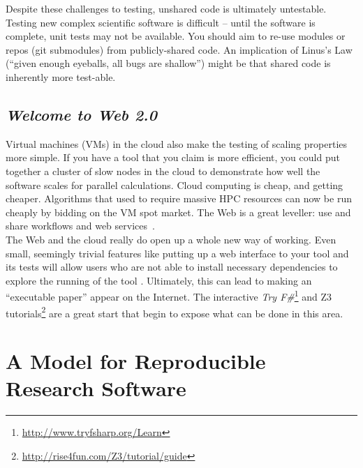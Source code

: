 \documentclass[a4paper,11pt]{article}
\begin{document}
 Despite these
challenges to testing, unshared code is ultimately untestable.
Testing new complex scientific software is difficult -- until the
software is complete, unit tests may not be available. You should aim
to re-use modules or repos (git submodules) from publicly-shared
code. An implication of Linus's Law (``given enough eyeballs, all bugs
are shallow'') might be that shared code is inherently more test-able.


\subsection{{\emph{Welcome to Web 2.0}}}

Virtual machines (VMs) in the cloud also make the testing of scaling
properties more simple.  If you have a tool that you claim is more
efficient, you could put together a cluster of slow nodes in the cloud
to demonstrate how well the software scales for parallel calculations.
Cloud computing is cheap, and getting cheaper. Algorithms that used to
require massive HPC resources can now be run cheaply by bidding on the
VM spot market. The Web is a great leveller: use and share workflows
and web services~\cite{crick-et-al:2009b,oabarriaga-et-al:2014}.\\

 The Web and the
cloud really do open up a whole new way of working. Even small,
seemingly trivial features like putting up a web interface to your
tool and its tests will allow users who are not able to install
necessary dependencies to explore the running of the tool
\cite{Hall2014}. Ultimately, this can lead to making an ``executable
paper'' appear on the Internet. The interactive {\em Try
F\#}\footnote{\url{http://www.tryfsharp.org/Learn}} and Z3
tutorials\footnote{\url{http://rise4fun.com/Z3/tutorial/guide}} are a
great start that begin to expose what can be done in this area.


\section{A Model for Reproducible Research Software}\label{sec:conclusion} 
\end{document}

